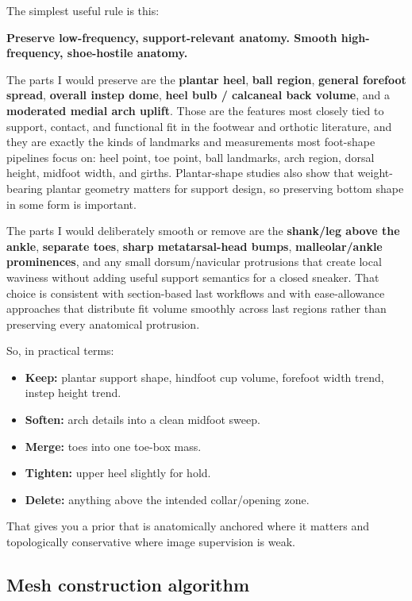 \documentclass[
  10.5pt,
]{article}
\providecommand{\tightlist}{%
  \setlength{\itemsep}{0pt}\setlength{\parskip}{0pt}}
\begin{document}
The simplest useful rule is this:

\textbf{Preserve low-frequency, support-relevant anatomy. Smooth
high-frequency, shoe-hostile anatomy.}

The parts I would preserve are the \textbf{plantar heel}, \textbf{ball
region}, \textbf{general forefoot spread}, \textbf{overall instep dome},
\textbf{heel bulb / calcaneal back volume}, and a \textbf{moderated
medial arch uplift}. Those are the features most closely tied to
support, contact, and functional fit in the footwear and orthotic
literature, and they are exactly the kinds of landmarks and measurements
most foot-shape pipelines focus on: heel point, toe point, ball
landmarks, arch region, dorsal height, midfoot width, and girths.
Plantar-shape studies also show that weight-bearing plantar geometry
matters for support design, so preserving bottom shape in some form is
important.

The parts I would deliberately smooth or remove are the
\textbf{shank/leg above the ankle}, \textbf{separate toes},
\textbf{sharp metatarsal-head bumps}, \textbf{malleolar/ankle
prominences}, and any small dorsum/navicular protrusions that create
local waviness without adding useful support semantics for a closed
sneaker. That choice is consistent with section-based last workflows and
with ease-allowance approaches that distribute fit volume smoothly
across last regions rather than preserving every anatomical protrusion.

So, in practical terms:

\begin{itemize}
\tightlist
\item
  \textbf{Keep:} plantar support shape, hindfoot cup volume, forefoot
  width trend, instep height trend.
\item
  \textbf{Soften:} arch details into a clean midfoot sweep.
\item
  \textbf{Merge:} toes into one toe-box mass.
\item
  \textbf{Tighten:} upper heel slightly for hold.
\item
  \textbf{Delete:} anything above the intended collar/opening zone.
\end{itemize}

That gives you a prior that is anatomically anchored where it matters
and topologically conservative where image supervision is weak.

\subsection{Mesh construction
algorithm}\label{mesh-construction-algorithm}
\end{document}
